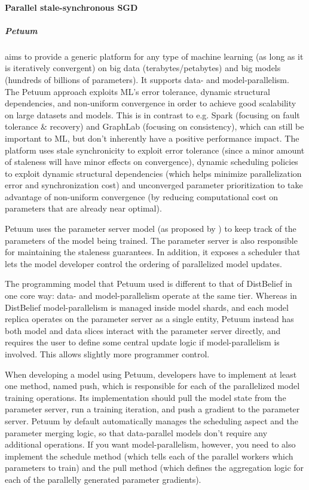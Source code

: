 \paragraph{Parallel stale-synchronous SGD}

\subparagraph{Petuum \citep{Xing2013}}

aims to provide a generic platform for any type of machine learning (as long as it is iteratively convergent) on big data (terabytes/petabytes) and big models (hundreds of billions of parameters). It supports data- and model-parallelism. The Petuum approach exploits ML’s error tolerance, dynamic structural dependencies, and non-uniform convergence in order to achieve good scalability on large datasets and models. This is in contrast to e.g. Spark (focusing on fault tolerance \& recovery) and GraphLab (focusing on consistency), which can still be important to ML, but don't inherently have a positive performance impact. The platform uses stale synchronicity to exploit error tolerance (since a minor amount of staleness will have minor effects on convergence), dynamic scheduling policies to exploit dynamic structural dependencies (which helps minimize parallelization error and synchronization cost) and unconverged parameter prioritization to take advantage of non-uniform convergence (by reducing computational cost on parameters that are already near optimal). 

Petuum uses the parameter server model (as proposed by \citet{DistBelief2012}) to keep track of the parameters of the model being trained. The parameter server is also responsible for maintaining the staleness guarantees. In addition, it exposes a scheduler that lets the model developer control the ordering of parallelized model updates.

The programming model that Petuum used is different to that of DistBelief in one core way: data- and model-parallelism operate at the same tier. Whereas in DistBelief model-parallelism is managed inside model shards, and each model replica operates on the parameter server as a single entity, Petuum instead has both model and data slices interact with the parameter server directly, and requires the user to define some central update logic if model-parallelism is involved. This allows slightly more programmer control.

When developing a model using Petuum, developers have to implement at least one method, named push, which is responsible for each of the parallelized model training operations. Its implementation should pull the model state from the parameter server, run a training iteration, and push a gradient to the parameter server. Petuum by default automatically manages the scheduling aspect and the parameter merging logic, so that data-parallel models don’t require any additional operations. If you want model-parallelism, however, you need to also implement the schedule method (which tells each of the parallel workers which parameters to train) and the pull method (which defines the aggregation logic for each of the parallelly generated parameter gradients).

